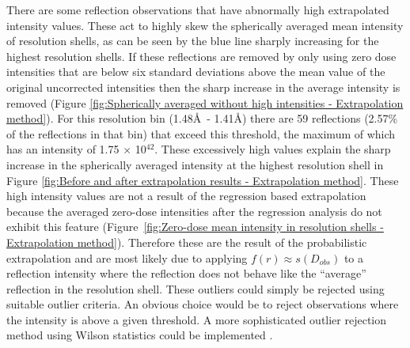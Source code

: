 There are some reflection observations that have abnormally high extrapolated intensity values.
These act to highly skew the spherically averaged mean intensity of resolution shells, as can be seen by the blue line sharply increasing for the highest resolution shells.
If these reflections are removed by only using zero dose intensities that are below six standard deviations above the mean value of the original uncorrected intensities then the sharp increase in the average intensity is removed (Figure \ref{fig:Spherically averaged without high intensities - Extrapolation method}).
For this resolution bin (1.48\AA\ - 1.41\AA) there are 59 reflections (2.57\% of the reflections in that bin) that exceed this threshold, the maximum of which has an intensity of 1.75 $\times$ 10$^{\text{42}}$.
These excessively high values explain the sharp increase in the spherically averaged intensity at the highest resolution shell in Figure \ref{fig:Before and after extrapolation results - Extrapolation method}.
These high intensity values are not a result of the regression based extrapolation because the averaged zero-dose intensities after the regression analysis do not exhibit this feature (Figure~\ref{fig:Zero-dose mean intensity in resolution shells - Extrapolation method}).
Therefore these are the result of the probabilistic extrapolation and are most likely due to applying $f(r) \approx s(D_{obs})$ to a reflection intensity where the reflection does not behave like the ``average'' reflection in the resolution shell.
These outliers could simply be rejected using suitable outlier criteria.
An obvious choice would be to reject observations where the intensity is above a given threshold.
A more sophisticated outlier rejection method using Wilson statistics could be implemented \cite{read1999detecting}.

